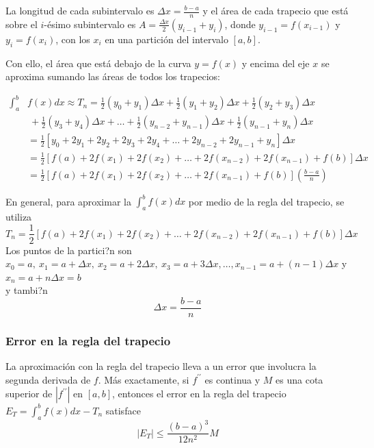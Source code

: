 
La longitud de cada subintervalo es $\Delta x=\frac{b-a}{n}$ y el área
de cada trapecio que está sobre el $i$-ésimo subintervalo es $A=\frac{\Delta x}{2}\left( y_{i-1}+y_{i}\right) $, donde $y_{i-1}=f(x_{i-1})$ y $y_{i}=f(x_{i})$, con los $x_i$ en una partición del intervalo $[a,b]$.


Con ello, el área que está debajo de la curva $y=f(x)$ y encima del
eje $x$ se aproxima sumando las áreas de todos los trapecios:

{\small
\begin{align*}
\int_{a}^{b}&f(x)dx\approx T_{n}=\frac{1}{2}\left( y_{0}+y_{1}\right) \Delta
x+\frac{1}{2}\left( y_{1}+y_{2}\right) \Delta x+\frac{1}{2}\left(
y_{2}+y_{3}\right) \Delta x\\
&\ +\frac{1}{2}\left( y_{3}+y_{4}\right) \Delta x+\ldots+\frac{1}{2}\left(
y_{n-2}+y_{n-1}\right) \Delta x+\frac{1}{2}\left( y_{n-1}+y_{n}\right)
\Delta x\\
&=\frac{1}{2}\left[ y_{0}+2y_{1}+2y_{2}+2y_{3}+2y_{4}+\ldots +2y_{n-2}+2y_{n-1}+y_{n}\right] \Delta x\\
&=\frac{1}{2}\left[f(a)+2f(x_{1})+2f(x_{2})+\ldots
+2f(x_{n-2})+2f(x_{n-1})+f(b)\right] \Delta x\\
&=\frac{1}{2}\left[f(a)+2f(x_{1})+2f(x_{2})+\ldots
+2f(x_{n-1})+f(b)\right] \left( \frac{b-a}{n}\right)
\end{align*}
}


En general, para aproximar la $\displaystyle\int_{a}^{b}f(x)dx$ por medio de la regla del trapecio, se utiliza
\[
T_{n}=\frac{1}{2}\left[ f(a)+2f(x_{1})+2f(x_{2})+\ldots+2f(x_{n-2})+2f(x_{n-1})+f(b)\right] \Delta x
\]
Los puntos de la partici?n son $x_{0}=a,\ x_{1}=a+\Delta x,\ x_{2}=a+2\Delta x,\ x_{3}=a+3\Delta x,\ldots,x_{n-1}=a+(n-1)\Delta x$ y $x_{n}=a+n\Delta x=b$\\

y tambi?n \\
\[
\Delta x=\frac{b-a}{n}
\]

\subsubsection*{Error en la regla del trapecio}

La aproximación con la regla del trapecio lleva a un error que involucra la segunda derivada de $f$. Más exactamente, si $f^{\prime\prime}$ es continua y $M$ es una cota superior de $\left\vert
f^{\prime\prime}\right\vert $ en $\left[ a,b\right] $, entonces el error en la regla del trapecio $E_{T}=\displaystyle\int_{a}^{b}f(x)dx-T_{n}$ satisface
\[
\left\vert E_{T}\right\vert \leq \frac{\left( b-a\right) ^{3}}{12n^{2}}M
\]


